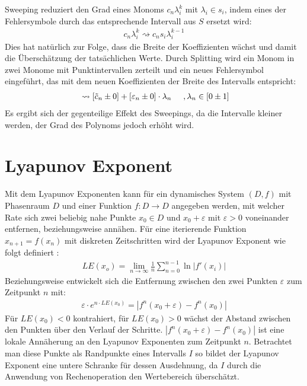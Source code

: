 Sweeping reduziert den Grad eines Monoms $c_n \lambda_i^k$ mit $\lambda_i \in s_i$, indem eines der Fehlersymbole durch das entsprechende Intervall aus $S$ ersetzt wird: 
\begin{align*}
 c_n \lambda_i^k \rightsquigarrow c_n s_i \lambda_i^{k-1}
\end{align*}
Dies hat natürlich zur Folge, dass die Breite der Koeffizienten wächst und damit die Überschätzung der tatsächlichen Werte. Durch Splitting wird ein Monom in zwei Monome mit Punktintervallen zerteilt und ein neues Fehlersymbol eingeführt, das mit dem neuen Koeffizienten der Breite des Intervalls entspricht:
\begin{align*}
 [\tilde{c}_n \pm \varepsilon_n]\ \rightsquigarrow [\tilde{c}_n \pm 0] + [\varepsilon_n \pm 0]\cdot  \lambda_n \hspace{0.5cm}, \lambda_n \in [0 \pm 1]
\end{align*}
Es ergibt sich der gegenteilige Effekt des Sweepings, da die Intervalle kleiner werden, der Grad des Polynoms jedoch erhöht wird.





\section{Lyapunov Exponent}
Mit dem Lyapunov Exponenten kann für ein dynamisches System $(D,f)$ mit Phasenraum $D$ und einer Funktion $f: D \rightarrow D$ angegeben werden, mit welcher Rate sich zwei beliebig nahe Punkte $x_0 \in D$ und $x_0 + \varepsilon$ mit $\varepsilon > 0$ voneinander entfernen, beziehungsweise annähen. Für eine iterierende Funktion $x_{n+1} = f(x_n)$ mit diskreten Zeitschritten wird der Lyapunov Exponent wie folgt definiert \cite{Plaschko1989}:
\begin{align}
 LE(x_o) = \lim_{n \rightarrow \infty} \frac{1}{n} \sum_{n=0}^{n-1} \ln |f'(x_i)|
\end{align}
Beziehungsweise entwickelt sich die Entfernung zwischen den zwei Punkten $\varepsilon$ zum Zeitpunkt $n$ mit:
\begin{align}
\label{distance}
 \varepsilon \cdot e^{n\cdot LE(x_0)} = |f^n(x_0 + \varepsilon) - f^n(x_0)|
\end{align}
Für $LE(x_0)<0$ kontrahiert, für $LE(x_0)>0$ wächst der Abstand zwischen den Punkten über den Verlauf der Schritte. $|f^n(x_0 + \varepsilon) - f^n(x_0)|$ ist eine lokale Annäherung an den Lyapunov Exponenten zum Zeitpunkt $n$. Betrachtet man diese Punkte als Randpunkte eines Intervalls $I$ so bildet der Lyapunov Exponent eine untere Schranke für dessen Ausdehnung, da $I$ durch die Anwendung von Rechenoperation den Wertebereich überschätzt.

